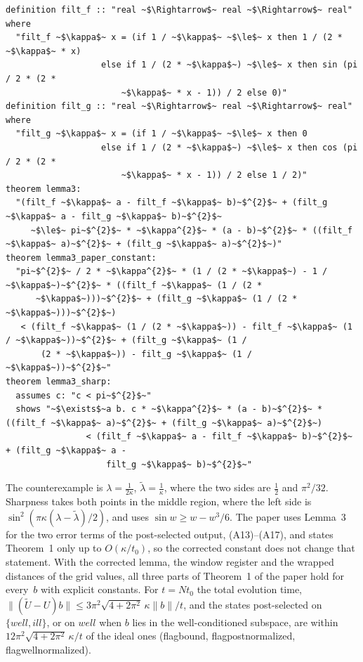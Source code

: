 \documentclass[runningheads]{llncs}
\newcommand{\norm}[1]{\|#1\|}
\DeclareRobustCommand{\isa}[1]{\textsf{\def\_{\char95\allowbreak}#1}}
\begin{document}
\begin{lstlisting}[float=tp,caption={The filter functions, Lemma~3 with the corrected constant, the counterexample
to the paper's constant, and sharpness (for fixed \isa{$\kappa$ > 0})},label={lst:lemma3}]
definition filt_f :: "real ~$\Rightarrow$~ real ~$\Rightarrow$~ real" where
  "filt_f ~$\kappa$~ x = (if 1 / ~$\kappa$~ ~$\le$~ x then 1 / (2 * ~$\kappa$~ * x)
                   else if 1 / (2 * ~$\kappa$~) ~$\le$~ x then sin (pi / 2 * (2 *
                       ~$\kappa$~ * x - 1)) / 2 else 0)"
definition filt_g :: "real ~$\Rightarrow$~ real ~$\Rightarrow$~ real" where
  "filt_g ~$\kappa$~ x = (if 1 / ~$\kappa$~ ~$\le$~ x then 0
                   else if 1 / (2 * ~$\kappa$~) ~$\le$~ x then cos (pi / 2 * (2 *
                       ~$\kappa$~ * x - 1)) / 2 else 1 / 2)"
theorem lemma3:
  "(filt_f ~$\kappa$~ a - filt_f ~$\kappa$~ b)~$^{2}$~ + (filt_g ~$\kappa$~ a - filt_g ~$\kappa$~ b)~$^{2}$~
     ~$\le$~ pi~$^{2}$~ * ~$\kappa^{2}$~ * (a - b)~$^{2}$~ * ((filt_f ~$\kappa$~ a)~$^{2}$~ + (filt_g ~$\kappa$~ a)~$^{2}$~)"
theorem lemma3_paper_constant:
  "pi~$^{2}$~ / 2 * ~$\kappa^{2}$~ * (1 / (2 * ~$\kappa$~) - 1 / ~$\kappa$~)~$^{2}$~ * ((filt_f ~$\kappa$~ (1 / (2 *
      ~$\kappa$~)))~$^{2}$~ + (filt_g ~$\kappa$~ (1 / (2 * ~$\kappa$~)))~$^{2}$~)
   < (filt_f ~$\kappa$~ (1 / (2 * ~$\kappa$~)) - filt_f ~$\kappa$~ (1 / ~$\kappa$~))~$^{2}$~ + (filt_g ~$\kappa$~ (1 /
       (2 * ~$\kappa$~)) - filt_g ~$\kappa$~ (1 / ~$\kappa$~))~$^{2}$~"
theorem lemma3_sharp:
  assumes c: "c < pi~$^{2}$~"
  shows "~$\exists$~a b. c * ~$\kappa^{2}$~ * (a - b)~$^{2}$~ * ((filt_f ~$\kappa$~ a)~$^{2}$~ + (filt_g ~$\kappa$~ a)~$^{2}$~)
                < (filt_f ~$\kappa$~ a - filt_f ~$\kappa$~ b)~$^{2}$~ + (filt_g ~$\kappa$~ a -
                    filt_g ~$\kappa$~ b)~$^{2}$~"
\end{lstlisting}

The counterexample is $\lambda=\frac1{2\kappa}$, $\tilde\lambda=\frac1\kappa$, where the two sides are
$\frac12$ and $\pi^2/32$. Sharpness takes both points in the middle region, where the left side is
$\sin^2(\pi\kappa(\lambda-\tilde\lambda)/2)$, and uses $\sin w\ge w-w^3/6$. The paper uses Lemma~3 for
the two error terms of the post-selected output, (A13)--(A17), and states Theorem~1 only up to
$O(\kappa/t_0)$, so the corrected constant does not change that statement.
With the corrected lemma, the window register and the wrapped distances of the grid values, all three
parts of Theorem~1 of the paper hold for every~$b$ with explicit constants. For $t=Nt_0$ the total
evolution time, $\norm{(\tilde U-U)b}\le3\pi^2\sqrt{4+2\pi^2}\,\kappa\norm b/t$, and the states
post-selected on $\{\mathit{well},\mathit{ill}\}$, or on $\mathit{well}$ when $b$ lies in the
well-conditioned subspace, are within $12\pi^2\sqrt{4+2\pi^2}\,\kappa/t$ of the ideal ones
(\isa{flag\_bound}, \isa{flag\_post\_normalized}, \isa{flag\_well\_normalized}).
\end{document}
